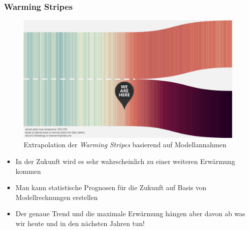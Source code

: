 \begin{frame}
	\frametitle{Warming Stripes}
	\begin{figure}
		\centering
		\includegraphics[width=0.55\linewidth]{bilder/warming_stripes_zukunft}
		\caption{Extrapolation der \textit{Warming Stripes} basierend auf Modellannahmen}
	\end{figure}
	\begin{itemize}
		\item In der Zukunft wird es sehr wahrscheinlich zu einer weiteren Erwärmung kommen
		\item Man kann statistische Prognosen für die Zukunft auf Basis von Modellrechnungen erstellen
		\item Der genaue Trend und die maximale Erwärmung hängen aber davon ab was wir heute und in den nächsten Jahren tun!
	\end{itemize}

\end{frame}
